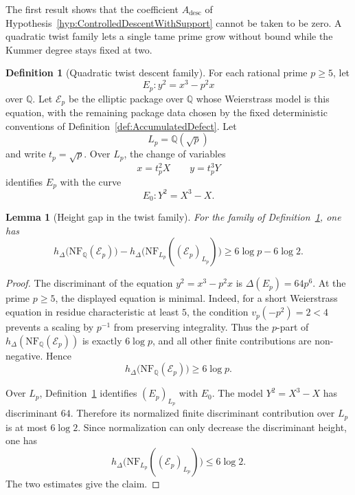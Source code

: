 \documentclass[10pt, reqno]{amsart}
\theoremstyle{plain}
\newtheorem{lemma}[theorem]{Lemma}
\theoremstyle{definition}
\newtheorem{definition}[theorem]{Definition}
\theoremstyle{plain}
\newcommand{\Q}{\mathbb{Q}}
\begin{document}
The first result shows that the coefficient $A_{\mathrm{desc}}$ of Hypothesis~\ref{hyp:ControlledDescentWithSupport} cannot be taken to be zero. A quadratic twist family lets a single tame prime grow without bound while the Kummer degree stays fixed at two.

\begin{definition}[Quadratic twist descent family]\label{def:QuadraticTwistDescentFamily}
For each rational prime $p\ge 5$, let
\[
  E_{p}\colon y^{2}=x^{3}-p^{2}x
\]
over $\Q$. Let $\mathcal{E}_{p}$ be the elliptic package over $\Q$ whose Weierstrass model is this equation, with the remaining package data chosen by the fixed deterministic conventions of Definition~\ref{def:AccumulatedDefect}. Let
\[
  L_{p}=\Q(\sqrt p)
\]
and write $t_{p}=\sqrt p$. Over $L_{p}$, the change of variables
\[
  x=t_{p}^{2}X
  \qquad
  y=t_{p}^{3}Y
\]
identifies $E_{p}$ with the curve
\[
  E_{0}\colon Y^{2}=X^{3}-X.
\]
\end{definition}

\begin{lemma}[Height gap in the twist family]\label{lem:QuadraticTwistHeightGap}
For the family of Definition~\ref{def:QuadraticTwistDescentFamily}, one has
\[
  h_{\Delta}\bigl(\mathrm{NF}_{\Q}(\mathcal{E}_{p})\bigr)
  -
  h_{\Delta}\bigl(\mathrm{NF}_{L_{p}}((\mathcal{E}_{p})_{L_{p}})\bigr)
  \ge
  6\log p-6\log 2.
\]
\end{lemma}

\begin{proof}
The discriminant of the equation $y^{2}=x^{3}-p^{2}x$ is $\Delta(E_{p})=64p^{6}$. At the prime $p\ge 5$, the displayed equation is minimal. Indeed, for a short Weierstrass equation in residue characteristic at least $5$, the condition $v_{p}(-p^{2})=2<4$ prevents a scaling by $p^{-1}$ from preserving integrality. Thus the $p$-part of $h_{\Delta}(\mathrm{NF}_{\Q}(\mathcal{E}_{p}))$ is exactly $6\log p$, and all other finite contributions are non-negative. Hence
\[
  h_{\Delta}\bigl(\mathrm{NF}_{\Q}(\mathcal{E}_{p})\bigr)\ge 6\log p.
\]

Over $L_{p}$, Definition~\ref{def:QuadraticTwistDescentFamily} identifies $(E_{p})_{L_{p}}$ with $E_{0}$. The model $Y^{2}=X^{3}-X$ has discriminant $64$. Therefore its normalized finite discriminant contribution over $L_{p}$ is at most $6\log 2$. Since normalization can only decrease the discriminant height, one has
\[
  h_{\Delta}\bigl(\mathrm{NF}_{L_{p}}((\mathcal{E}_{p})_{L_{p}})\bigr)
  \le
  6\log 2.
\]
The two estimates give the claim.
\end{proof}
\end{document}
